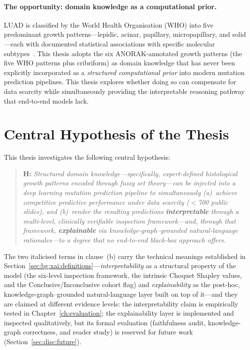 \paragraph{The opportunity: domain knowledge as a computational prior.}
LUAD is classified by the World Health Organisation (WHO) into five predominant growth patterns---lepidic, acinar, papillary, micropapillary, and solid---each with documented statistical associations with specific molecular subtypes~\cite{travis2011iaslc, tsao2015subtype}.  This thesis adopts the six ANORAK-annotated growth patterns (the five WHO patterns plus cribriform) as domain knowledge that has never been explicitly incorporated as a \emph{structured computational prior} into modern mutation prediction pipelines.  This thesis explores whether doing so can compensate for data scarcity while simultaneously providing the interpretable reasoning pathway that end-to-end models lack.

\section{Central Hypothesis of the Thesis}
\label{sec:intro:hypothesis}

This thesis investigates the following central hypothesis:

\begin{quote}
\textbf{H:} \emph{Structured domain knowledge---specifically,
expert-defined histological growth patterns encoded through fuzzy set
theory---can be injected into a deep learning mutation prediction
pipeline to simultaneously
(a)~achieve competitive predictive performance under data scarcity
($<$700 public slides), and
(b)~render the resulting predictions \textbf{interpretable} through
a multi-level, clinically verifiable inspection framework---and,
through that framework, \textbf{explainable} via knowledge-graph--grounded
natural-language rationales---to a degree that no end-to-end black-box
approach offers.}
\end{quote}

The two italicised terms in clause~(b) carry the technical
meanings established in
Section~\ref{sec:bg:xai:definitions}---\emph{interpretability}
as a structural property of the model (the six-level inspection
framework, the intrinsic Choquet Shapley values, and the
Conclusive/Inconclusive cohort flag) and \emph{explainability}
as the post-hoc, knowledge-graph--grounded natural-language layer
built on top of it---and they are claimed at different evidence
levels: the interpretability claim is empirically tested in
Chapter~\ref{ch:evaluation}; the explainability layer is
implemented and inspected qualitatively, but its formal
evaluation (faithfulness audit, knowledge-graph correctness, and
reader study) is reserved for future work
(Section~\ref{sec:disc:future}).

